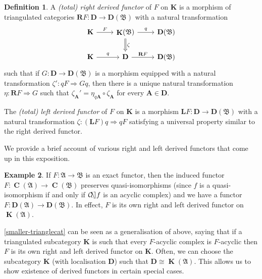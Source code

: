 \documentclass[a4paper]{article}
\theoremstyle{definition}
\newtheorem{defn}{Definition}[section]
\newtheorem{example}[defn]{Example}
\theoremstyle{remark}
\DeclareMathOperator{\cone}{\mathcal{C\kern -2pt o \kern -2pt n \kern -2pt e
\kern -2pt}}
\DeclareMathOperator{\Ch}{\mathbf{C}}
\DeclareMathOperator{\kom}{{\mathbf{K}}}
\newcommand{\deri}{\mathbf{D}}
\begin{document}
\begin{defn}
    A \textit{(total) right derived functor} of \(F\) on \(\mathbf{K}\) is a
    morphism of triangulated categories \({\mathbf{R}F: \mathbf{D}\rightarrow
    \mathbf{D}(\mathfrak{B})}\) with a natural transformation 
    \[\begin{tikzcd}
        \mathbf{K}\arrow[r,"F"] 
        &\kom(\mathfrak{B}) \arrow[r,"q"] \arrow[d, Rightarrow, "\zeta"]
        & \deri(\mathfrak{B}) \\ 
        \mathbf{K} \arrow[r,"q"] 
        &\mathbf{D} \arrow[r, "\mathbf{R}F"]
        &\deri(\mathfrak{B})
    \end{tikzcd}\]
    such that if \(G:\mathbf{D}\rightarrow \deri(\mathfrak{B})\) is
    a morphism equipped with a natural transformation \(\zeta':
    qF\Rightarrow Gq \), then there is a unique natural transformation \(\eta:
    \mathbf{R}F\Rightarrow G\) such that \(\zeta_\mathbf{A}' = \eta_{q
    \mathbf{A}} \circ \zeta_\mathbf{A}\) for every \(\mathbf{A}\in \deri\).

    The \textit{(total) left derived functor} of \(F\) on \(\mathbf{K}\) is a
    morphism \(\mathbf{L}F: \mathbf{D}\rightarrow \deri(\mathfrak{B})\) with a
    natural transformation \(\zeta: (\mathbf{L}F)q\Rightarrow qF\) satisfying a
    universal property similar to the right derived functor.
\end{defn}

We provide a brief account of various right and left derived functors that come
up in this exposition.

\begin{example}
    If \(F:\mathfrak{A}\rightarrow \mathfrak{B}\) is an exact functor, then the
    induced functor \(F:\Ch(\mathfrak{A})\rightarrow \Ch(\mathfrak{B})\)
    preserves quasi-isomorphisms (since \(f\) is a quasi-isomorphism if and only
    if \(\cone f\) is an acyclic complex) and we have a functor
    \(F:\deri(\mathfrak{A})\rightarrow \deri(\mathfrak{B})\). In effect,
    \(F\) is its own right and left derived functor on \(\kom(\mathfrak{A})\).
\end{example}

\cref{smaller-trianglecat} can be seen as a generalisation of above, saying that
if a triangulated subcategory \(\mathbf{K}\) is such that every \(F\)-acyclic
complex is \(F\)-acyclic then \(F\) is its own right and left derived
functor on \(\mathbf{K}\). Often, we can choose the subcategory \(\mathbf{K}\) (with
localisation \(\mathbf{D}\)) such that \(\mathbf{D}\cong \kom(\mathfrak{A})\).
This allows us to show existence of derived functors in certain special cases.
\end{document}
